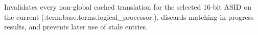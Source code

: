 Invalidates every non-global cached translation for the selected 16-bit ASID on the current (:term:base.terms.logical_processor:), discards matching in-progress results, and prevents later use of stale entries.
